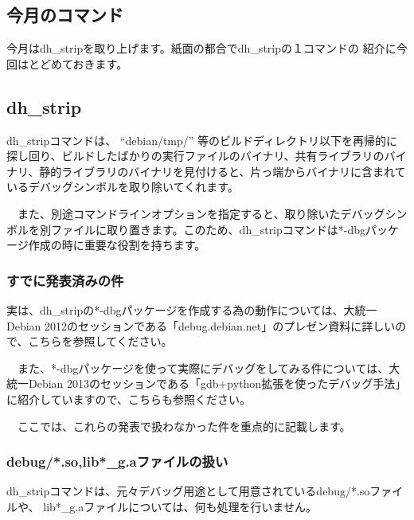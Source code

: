 \documentclass[mingoth,a4paper]{jsarticle}
\begin{document}

\subsection{今月のコマンド}

 今月はdh\_stripを取り上げます。紙面の都合でdh\_stripの１コマンドの
紹介に今回はとどめておきます。

\subsection{dh\_strip}

 dh\_stripコマンドは、 ``debian/tmp/'' 等のビルドディレクトリ以下を再帰的に
探し回り、ビルドしたばかりの実行ファイルのバイナリ、共有ライブラリのバイナリ、静的ライブラリのバイナリを見付けると、片っ端からバイナリに含まれているデバッグシンボルを取り除いてくれます。

　また、別途コマンドラインオプションを指定すると、取り除いたデバッグシンボルを別ファイルに取り置きます。このため、dh\_stripコマンドは*-dbgパッケージ作成の時に重要な役割を持ちます。

\subsubsection{すでに発表済みの件}

 実は、dh\_stripの*-dbgパッケージを作成する為の動作については、大統一Debian 2012のセッションである「debug.debian.net」\cite{debug-debian-net}のプレゼン資料に詳しいので、こちらを参照してください。

　また、*-dbgパッケージを使って実際にデバッグをしてみる件については、大統一Debian 2013のセッションである「gdb+python拡張を使ったデバッグ手法」\cite{gdb-python-debug2}に紹介していますので、こちらも参照ください。

　ここでは、これらの発表で扱わなかった件を重点的に記載します。

\subsubsection{debug/*.so,lib*\_g.aファイルの扱い}

 dh\_stripコマンドは、元々デバッグ用途として用意されているdebug/*.soファイルや、
lib*\_g.aファイルについては、何も処理を行いません。
\end{document}

